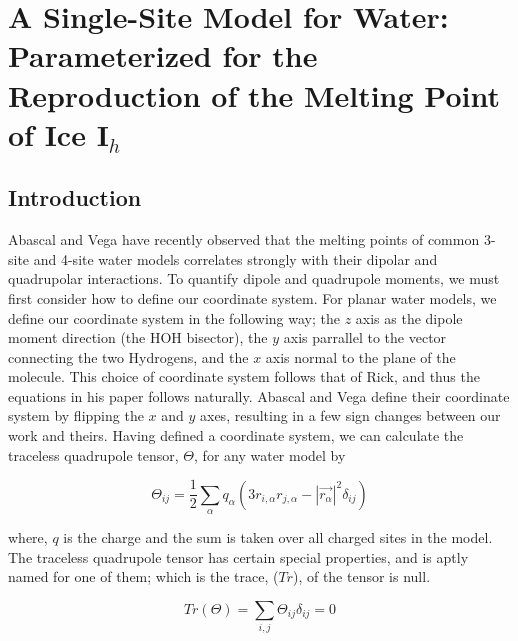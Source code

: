 

% 

\chapter{A Single-Site Model for Water: Parameterized for the Reproduction of the Melting Point of Ice I$_h$}

\newcommand{\degree}{\ensuremath{^\circ}}


\section{Introduction}
Abascal and Vega have recently observed that the melting points of common 
3-site and 4-site water models correlates strongly with their dipolar and 
quadrupolar interactions.\cite{Abascal07b,Abascal07c,Abascal07d} To quantify
dipole and quadrupole moments, we must first consider how to define our
coordinate system. For planar
water models, we define our coordinate system in the following way;
the $z$ axis as the dipole moment direction (the HOH bisector), the $y$ axis
parrallel to the vector connecting the two Hydrogens, and the $x$ axis normal 
to the plane of the molecule. This choice of coordinate system follows that of
Rick, and thus the equations in his paper follows naturally. 
Abascal and Vega define their coordinate system by flipping the $x$ and $y$
axes, resulting in a few sign changes between our work and theirs. Having 
defined a coordinate system, we can calculate the traceless quadrupole tensor,
$\Theta$, for any water model by

\begin{equation}
\Theta_{ij} = \frac{1}{2} \sum_{\alpha}q_{\alpha}(3r_{i,\alpha}r_{j,\alpha}-|\vec{r_{\alpha}}|^{2}\delta_{ij})
\end{equation}

where, $q$ is the charge and the sum is taken over all charged sites in the 
model. The traceless quadrupole tensor has certain special properties, and
is aptly named for one of them; which is the trace, ($Tr$), of the tensor 
is null.

\begin{equation}
Tr(\Theta) = \sum_{i,j}\Theta_{ij}\delta_{ij} = 0
\end{equation}

